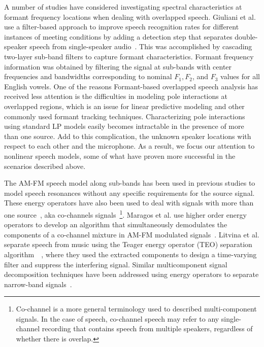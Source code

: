 A number of studies have considered investigating spectral characteristics at formant frequency locations when dealing with overlapped speech. 
Giuliani et al. use a filter-based approach to improve speech recognition rates for different instances of meeting conditions by adding a detection step that separates double-speaker speech from single-speaker audio~\cite{giuliani_meeting}. 
This was accomplished by cascading two-layer sub-band filters to capture formant characteristics. 
Formant frequency information was obtained by filtering the signal at sub-bands with center frequencies and bandwidths corresponding to nominal ${F_1, F_2}$, and ${F_3}$ values for all English vowels. 
One of the reasons Formant-based overlapped speech analysis has received less attention is the difficulties in modeling pole interactions at overlapped regions, which is an issue for linear predictive modeling and other commonly used formant tracking techniques. 
Characterizing pole interactions using standard LP models easily becomes intractable in the presence of more than one source. 
Add to this complication, the unknown speaker locations with respect to each other and the microphone. 
As a result, we focus our attention to nonlinear speech models, some of what have proven more successful in the scenarios described above. 

The AM-FM speech model along sub-bands\cite{maragos_kaiser_quatieri} has been used in previous studies to model speech resonances without any specific requirements for the source signal. These energy operators have also been used to deal with signals with more than one source~\cite{maragos_instantaneousenergy}, aka co-channels signals~\footnote{Co-channel is a more general terminology used to described multi-component signals. In the case of speech, co-channel speech may refer to any single-channel recording that contains speech from multiple speakers, regardless of whether there is overlap.}. 
Maragos et al. use higher order energy operators to develop an algorithm that simultaneously demodulates the components of a co-channel mixture in AM-FM modulated signals~\cite{maragos_instantaneousenergy}. 
Litvina et al. separate speech from music using the Teager energy operator (TEO) separation algorithm~\cite{maragos_kaiser_quatieri}~\cite{Litvin2010}, where they used the extracted components to design a time-varying filter and suppress the interfering signal. 
Similar multicomponent signal decomposition techniques have been addressed using energy operators to separate narrow-band signals~\cite{Linicassp95,hu12_nullspacepersuit,santhanam_maragos_2000}. 

